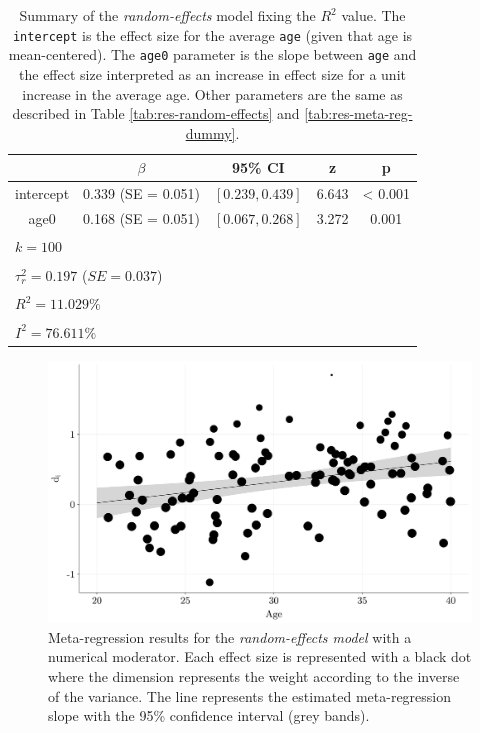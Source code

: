 \documentclass[
  man,floatsintext]{apa6}
\begin{document}
\normalsize

\scriptsize

\begin{table}[H]

\caption{\label{tab:res-meta-reg-numerical-r2}Summary of the \emph{random-effects} model fixing the \(R^{2}\) value. The \texttt{intercept} is the effect size for the average \texttt{age} (given that age is mean-centered). The \texttt{age0} parameter is the slope between \texttt{age} and the effect size interpreted as an increase in effect size for a unit increase in the average age. Other parameters are the same as described in Table \ref{tab:res-random-effects} and \ref{tab:res-meta-reg-dummy}.}
\centering
\fontsize{9}{11}\selectfont
\begin{tabular}[t]{ccccc}
\toprule
 & $\beta$ & 95\% CI & z & p\\
\midrule
intercept & 0.339 (SE = 0.051) & $[0.239, 0.439]$ & 6.643 & < 0.001\\
age0 & 0.168 (SE = 0.051) & $[0.067, 0.268]$ & 3.272 & 0.001\\
\bottomrule
\multicolumn{5}{l}{\textsuperscript{} $k = 100$}\\
\multicolumn{5}{l}{\textsuperscript{} $\tau^2_r = 0.197$ ($SE = 0.037$)}\\
\multicolumn{5}{l}{\textsuperscript{} $R^2 = 11.029\%$}\\
\multicolumn{5}{l}{\textsuperscript{} $I^2 = 76.611\%$}\\
\end{tabular}
\end{table}

\normalsize

\scriptsize

\begin{figure}[H]

{\centering \includegraphics[width=0.8\linewidth]{paper_files/figure-latex/plot-meta-reg-numerical-r2-1} 

}

\caption{Meta-regression results for the \emph{random-effects model} with a numerical moderator. Each effect size is represented with a black dot where the dimension represents the weight according to the inverse of the variance. The line represents the estimated meta-regression slope with the 95\% confidence interval (grey bands).}\label{fig:plot-meta-reg-numerical-r2}
\end{figure}
\end{document}
